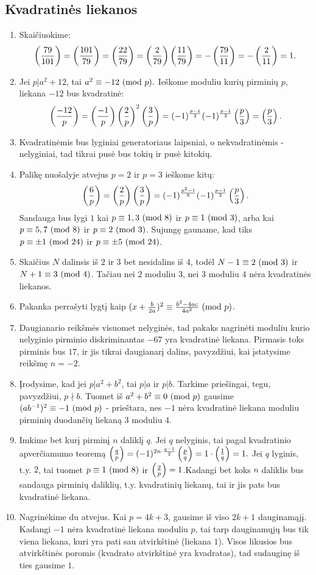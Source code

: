 \subsection*{Kvadratinės liekanos}
\begin{enumerate} 
\item 
Skaičiuokime:$$\left(\frac{79}{101}\right) =\left(\frac{101}{79}\right) =\left(\frac{22}{79}\right)
=\left(\frac{2}{79}\right)\left(\frac{11}{79}\right) =-\left(\frac{79}{11}\right) =-\left(\frac{2}{11}\right) = 1.$$
\item 
Jei $p|a^2 + 12$, tai $a^2 \equiv -12 \ (\text{mod } p).$ Ieškome moduliu kurių
pirminių $p$, liekana $-12$ bus kvadratinė:
$$\left(\frac{-12}{p}\right) = \left(\frac{-1}{p}\right)\left(\frac{2}{p}\right)^2\left(\frac{3}{p}\right) =
(-1)^\frac{p-1}2(-1)^\frac{p-1}{2}\left(\frac{p}{3}\right) = \left(\frac{p}{3}\right).$$
\item 
Kvadratinėmis bus lyginiai generatoriaus laipsniai, o nekvadratinėmis -
nelyginiai, tad tikrai pusė bus tokių ir pusė kitokių.
\item 
Palikę nuošalyje atvejus $p=2$ ir $p=3$ ieškome kitų:
$$\left(\frac{6}{p}\right) = \left(\frac{2}{p}\right)\left(\frac{3}{p}\right) =
(-1)^\frac{p^2-1}{8}(-1)^\frac{p-1}{2}\left(\frac{p}{3}\right).$$
Sandauga bus lygi $1$ kai $p\equiv 1, 3 \ (\text{mod } 8)$ ir $p\equiv 1\ (\text{mod } 3)$,
arba kai $p\equiv 5, 7 \ (\text{mod } 8)$ ir $p\equiv 2\ (\text{mod } 3)$. Sujungę gauname,
kad tiks $p \equiv \pm 1 \ (\text{mod } 24)$ ir $p \equiv \pm 5\ (\text{mod } 24)$.
\item 
Skaičius $N$ dalinsis iš $2$ ir $3$ bet nesidalins iš $4$, todėl
$N - 1 \equiv 2 \ (\text{mod } 3)$ ir $N+1 \equiv 3 \ (\text{mod } 4)$. Tačiau nei $2$ moduliu
$3$, nei $3$ moduliu $4$ nėra kvadratinės liekanos.
\item 
Pakanka perrašyti lygtį kaip $(x+\frac{b}{2a})^2 \equiv
\frac{b^2-4ac}{4a^2}\ (\text{mod } p)$.
\item 
Daugianario reikšmės visuomet nelyginės, tad pakaks nagrinėti moduliu
kurio nelyginio pirminio diskriminantas $-67$ yra kvadratinė liekana.
Pirmasis toks pirminis bus $17$, ir jis tikrai daugianarį dalins,
pavyzdžiui, kai įstatysime reikšmę $n=-2$.
\item 
Įrodysime, kad jei $p|a^2 + b^2$, tai $p|a$ ir $p|b$. Tarkime
priešingai, tegu, pavyzdžiui, $p\nmid b$. Tuomet iš $a^2 + b^2 \equiv 0\ (\text{mod } p)$
gausime $(ab^{-1})^2\equiv -1 \ (\text{mod } p)$ - prieštara, nes $-1$ nėra
kvadratinė liekana moduliu pirminių duodančių liekaną $3$ moduliu
$4$.
\item 
Imkime bet kurį pirminį $n$ daliklį $q$. Jei $q$ nelyginis, tai pagal
kvadratinio apverčiamumo teoremą $\left(\frac{q}{p}\right) = (-1)^{2n\cdot
\frac{q-1}{2}} \left(\frac{p}{q}\right)= 1\cdot \left(\frac{1}{q}\right) = 1.$ Jei $q$ lyginis,
t.y. $2$, tai tuomet $p \equiv 1 \ (\text{mod } 8)$ ir $\left(\frac{2}{p}\right) = 1$.Kadangi
bet koks $n$ daliklis bus sandauga pirminių daliklių, t.y. kvadratinių
liekanų, tai ir jis pats bus kvadratinė liekana.
\item 
Nagrinėkime du atvejus. Kai $p = 4k + 3$, gausime iš viso $2k + 1$
dauginamąjį. Kadangi $-1$ nėra kvadratinė liekana moduliu $p$, tai
tarp dauginamųjų bus tik viena liekana, kuri yra pati sau atvirkštinė
(liekana $1$).  Visos likusios bus atvirkštinės poromis (kvadrato
atvirkštinė yra kvadratas), tad sudauginę iš ties gausime $1$.


\end{enumerate}
